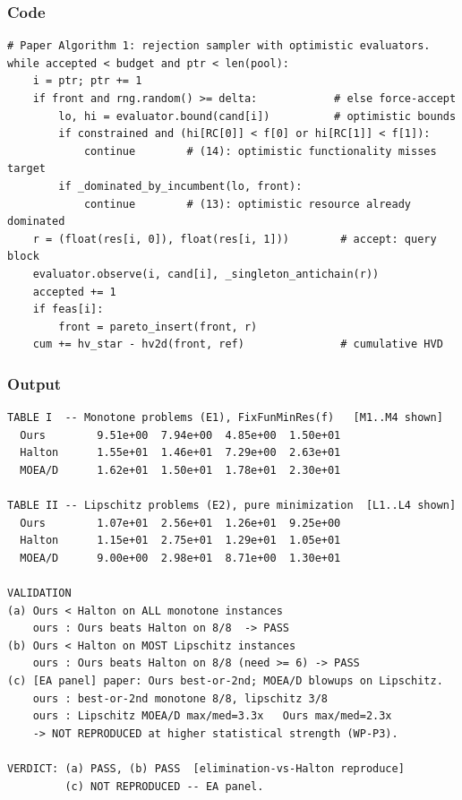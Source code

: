 \documentclass[11pt,a4paper]{article}
\begin{document}
\subsubsection*{Code}
\begin{lstlisting}
# Paper Algorithm 1: rejection sampler with optimistic evaluators.
while accepted < budget and ptr < len(pool):
    i = ptr; ptr += 1
    if front and rng.random() >= delta:            # else force-accept
        lo, hi = evaluator.bound(cand[i])          # optimistic bounds
        if constrained and (hi[RC[0]] < f[0] or hi[RC[1]] < f[1]):
            continue        # (14): optimistic functionality misses target
        if _dominated_by_incumbent(lo, front):
            continue        # (13): optimistic resource already dominated
    r = (float(res[i, 0]), float(res[i, 1]))        # accept: query block
    evaluator.observe(i, cand[i], _singleton_antichain(r))
    accepted += 1
    if feas[i]:
        front = pareto_insert(front, r)
    cum += hv_star - hv2d(front, ref)               # cumulative HVD
\end{lstlisting}

\subsubsection*{Output}
\begin{lstlisting}[language={},numbers=none,keywordstyle={}]
TABLE I  -- Monotone problems (E1), FixFunMinRes(f)   [M1..M4 shown]
  Ours        9.51e+00  7.94e+00  4.85e+00  1.50e+01
  Halton      1.55e+01  1.46e+01  7.29e+00  2.63e+01
  MOEA/D      1.62e+01  1.50e+01  1.78e+01  2.30e+01

TABLE II -- Lipschitz problems (E2), pure minimization  [L1..L4 shown]
  Ours        1.07e+01  2.56e+01  1.26e+01  9.25e+00
  Halton      1.15e+01  2.75e+01  1.29e+01  1.05e+01
  MOEA/D      9.00e+00  2.98e+01  8.71e+00  1.30e+01

VALIDATION
(a) Ours < Halton on ALL monotone instances
    ours : Ours beats Halton on 8/8  -> PASS
(b) Ours < Halton on MOST Lipschitz instances
    ours : Ours beats Halton on 8/8 (need >= 6) -> PASS
(c) [EA panel] paper: Ours best-or-2nd; MOEA/D blowups on Lipschitz.
    ours : best-or-2nd monotone 8/8, lipschitz 3/8
    ours : Lipschitz MOEA/D max/med=3.3x   Ours max/med=2.3x
    -> NOT REPRODUCED at higher statistical strength (WP-P3).

VERDICT: (a) PASS, (b) PASS  [elimination-vs-Halton reproduce]
         (c) NOT REPRODUCED -- EA panel.
\end{lstlisting}
\end{document}
